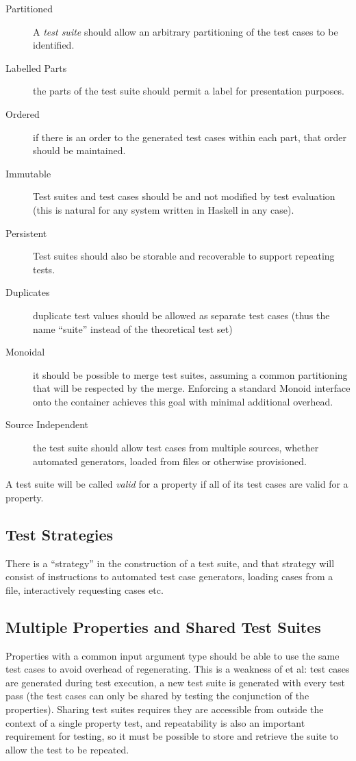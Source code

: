 \begin{description}
\item[Partitioned] A \emph{test suite} should allow an arbitrary partitioning of the test cases to be identified.
\item[Labelled Parts] the parts of the test suite should permit a label for presentation purposes.
\item[Ordered] if there is an order to the generated test cases within each part, that order should be maintained.
\item[Immutable] Test suites and test cases should be 
and not modified by test evaluation
(this is natural for any system written in Haskell in any case).
\item[Persistent]Test suites should also be storable and recoverable to support repeating tests.
\item[Duplicates] duplicate test values should be allowed as separate test cases
(thus the name ``suite'' instead of the theoretical test set)
\item[Monoidal] it should be possible to merge test suites, 
assuming a common partitioning that will be respected by the merge.
Enforcing a standard Monoid interface onto the container achieves this goal with minimal additional overhead.
\item[Source Independent] the test suite should allow test cases from multiple sources,
whether automated generators, loaded from files or otherwise provisioned.
\end{description}

A test suite will be called \emph{valid} for a property if all of its test cases are valid for a property.


\subsection{Test Strategies}
There is a ``strategy'' in the construction of a test suite,
and that strategy will consist of instructions to automated test case generators,
loading cases from a file, interactively requesting cases etc.


\subsection{Multiple Properties and Shared Test Suites}

Properties with a common input argument type
should be able to use the same test cases to avoid overhead of regenerating.
This is a weakness of \QC et al:
test cases are generated during test execution,
a new test suite is generated with every test pass
(the test cases can only be shared by testing the conjunction of the properties).
Sharing test suites requires they are accessible from outside the context of a single property test,
and repeatability is also an important requirement for testing,
so it must be possible to store and retrieve the suite to allow the test to be repeated.

